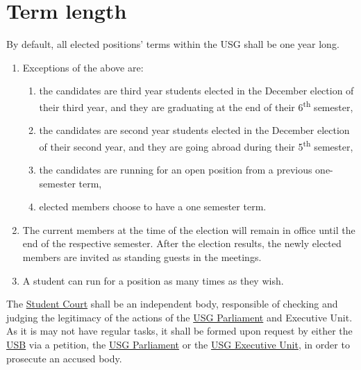 \documentclass[12pt]{LaTeX_Misc/constitution}
\begin{document}
\section{Term length}
By default, all elected positions' terms within the USG shall be one year long.
\begin{enumerate}[label={\textbf{\S\arabic*}}]
\item Exceptions of the above are:
\begin{enumerate}
\item 
the candidates are third year students elected in the December election of their third year, and they are graduating at the end of their 6\textsuperscript{th} semester,
\item 
the candidates are second year students elected in the December election of their second year, and they are going abroad during their 5\textsuperscript{th} semester,
\item
the candidates are running for an open position from a previous one-semester term,
\item
elected members choose to have a one semester term.
\end{enumerate}
\item
The current members at the time of the election will remain in office until the end of the respective semester. After the election results, the newly elected members are invited as standing guests in the meetings. 
\item
A student can run for a position as many times as they wish.

\end{enumerate}



\label{StudentCourtDef}
The \hyperref[StudentCourtDef]{Student Court} shall be an independent body, responsible of checking and judging the legitimacy of the actions of the \hyperref[USGParliamentDef]{USG Parliament} and Executive Unit. As it is may not have regular tasks, it shall be formed upon request by either the \hyperref[studentbody]{USB} via a petition, the \hyperref[USGParliamentDef]{USG Parliament} or the \hyperref[USGexecutiveUnitDef]{USG Executive Unit}, in order to prosecute an accused body.
\end{document}
